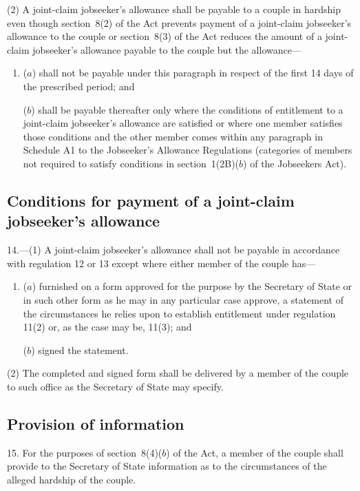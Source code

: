 \documentclass[12pt,a4paper]{article}
\begin{document}
(2) A joint-claim jobseeker’s allowance shall be payable to a couple in hardship even though section~8(2) of the Act prevents payment of a joint-claim jobseeker’s allowance to the couple or section~8(3) of the Act reduces the amount of a joint-claim jobseeker’s allowance payable to the couple but the allowance—
\begin{enumerate}\item[]
($a$) shall not be payable under this paragraph in respect of the first 14 days of the prescribed period; and

($b$) shall be payable thereafter only where the conditions of entitlement to a joint-claim jobseeker’s allowance are satisfied or where one member satisfies those conditions and the other member comes within any paragraph in Schedule A1 to the Jobseeker’s Allowance Regulations (categories of members not required to satisfy conditions in section~1(2B)($b$)  of the Jobseekers Act).
\end{enumerate}

\subsection[14. Conditions for payment of a joint-claim jobseeker’s allowance]{\sloppy Conditions for payment of a joint-claim jobseeker’s allowance}

14.---(1)  A joint-claim jobseeker’s allowance shall not be payable in accordance with regulation 12 or 13 except where either member of the couple has—
\begin{enumerate}\item[]
($a$) furnished on a form approved for the purpose by the Secretary of State or in such other form as he may in any particular case approve, a statement of the circumstances he relies upon to establish entitlement under regulation 11(2) or, as the case may be, 11(3); and

($b$) signed the statement.
\end{enumerate}

(2) The completed and signed form shall be delivered by a member of the couple to such office as the Secretary of State may specify.

\subsection[15. Provision of information]{Provision of information}

15.  For the purposes of section~8(4)($b$)  of the Act, a member of the couple shall provide to the Secretary of State information as to the circumstances of the alleged hardship of the couple.
\end{document}
